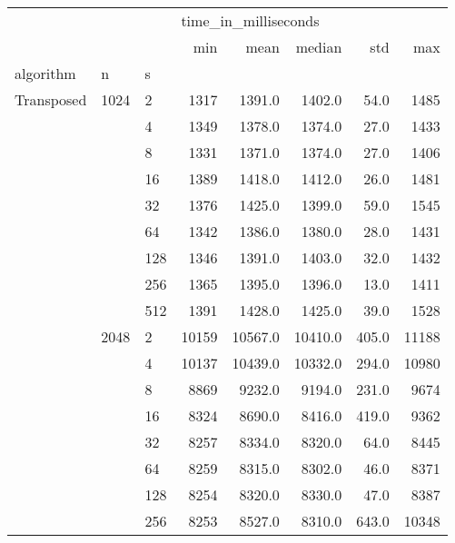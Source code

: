 \begin{tabular}{lllrrrrr}
\toprule
           &      &      & \multicolumn{5}{l}{time\_in\_milliseconds} \\
           &      &      &                  min &     mean &   median &    std &    max \\
algorithm & n & s &                      &          &          &        &        \\
\midrule
Transposed & 1024 & 2    &                 1317 &   1391.0 &   1402.0 &   54.0 &   1485 \\
           &      & 4    &                 1349 &   1378.0 &   1374.0 &   27.0 &   1433 \\
           &      & 8    &                 1331 &   1371.0 &   1374.0 &   27.0 &   1406 \\
           &      & 16   &                 1389 &   1418.0 &   1412.0 &   26.0 &   1481 \\
           &      & 32   &                 1376 &   1425.0 &   1399.0 &   59.0 &   1545 \\
           &      & 64   &                 1342 &   1386.0 &   1380.0 &   28.0 &   1431 \\
           &      & 128  &                 1346 &   1391.0 &   1403.0 &   32.0 &   1432 \\
           &      & 256  &                 1365 &   1395.0 &   1396.0 &   13.0 &   1411 \\
           &      & 512  &                 1391 &   1428.0 &   1425.0 &   39.0 &   1528 \\
           & 2048 & 2    &                10159 &  10567.0 &  10410.0 &  405.0 &  11188 \\
           &      & 4    &                10137 &  10439.0 &  10332.0 &  294.0 &  10980 \\
           &      & 8    &                 8869 &   9232.0 &   9194.0 &  231.0 &   9674 \\
           &      & 16   &                 8324 &   8690.0 &   8416.0 &  419.0 &   9362 \\
           &      & 32   &                 8257 &   8334.0 &   8320.0 &   64.0 &   8445 \\
           &      & 64   &                 8259 &   8315.0 &   8302.0 &   46.0 &   8371 \\
           &      & 128  &                 8254 &   8320.0 &   8330.0 &   47.0 &   8387 \\
           &      & 256  &                 8253 &   8527.0 &   8310.0 &  643.0 &  10348 \\

\end{tabular}
